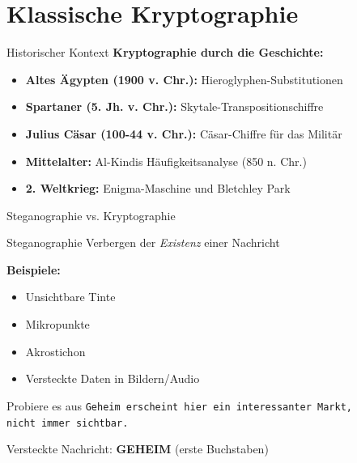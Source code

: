 \documentclass[handout]{beamer}
\begin{document}

\section{Klassische Kryptographie}

\begin{frame}{Historischer Kontext}
\textbf{Kryptographie durch die Geschichte:}

\begin{itemize}
    \item \textbf{Altes Ägypten (1900 v. Chr.):} Hieroglyphen-Substitutionen
    \item \textbf{Spartaner (5. Jh. v. Chr.):} Skytale-Transpositionschiffre
    \item \textbf{Julius Cäsar (100-44 v. Chr.):} Cäsar-Chiffre für das Militär
    \item \textbf{Mittelalter:} Al-Kindis Häufigkeitsanalyse (850 n. Chr.)
    \item \textbf{2. Weltkrieg:} Enigma-Maschine und Bletchley Park
\end{itemize}

\end{frame}

\begin{frame}{Steganographie vs. Kryptographie}
\begin{block}{Steganographie}
Verbergen der \emph{Existenz} einer Nachricht
\end{block}

\textbf{Beispiele:}
\begin{itemize}
    \item Unsichtbare Tinte
    \item Mikropunkte
    \item Akrostichon
    \item Versteckte Daten in Bildern/Audio
\end{itemize}
\pause
\vspace{0.3cm}
\begin{exampleblock}{Probiere es aus}
\texttt{Geheim erscheint hier ein interessanter Markt,\\
nicht immer sichtbar.}
\end{exampleblock}\pause

Versteckte Nachricht: \textbf{GEHEIM} (erste Buchstaben)

\end{frame}
\end{document}
